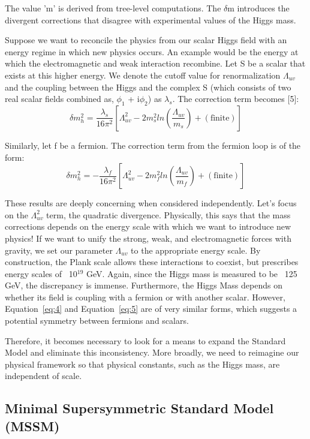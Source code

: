 \documentclass{article}
\begin{document}
The value 'm' is derived from tree-level computations. The $\delta$m introduces the divergent corrections that disagree with experimental values of the Higgs mass.
\par
Suppose we want to reconcile the physics from our scalar Higgs field with an energy regime in which new physics occurs. An example would be the energy at which the electromagnetic and weak interaction recombine. Let S be a scalar that exists at this higher energy. We denote the cutoff value for renormalization $\Lambda_{uv}$ and the coupling between the Higgs and the complex S (which consists of two real scalar fields combined as, $\phi_{1}$ + i$\phi_{2}$) as $\lambda_{s}$. The correction term becomes [5]:
\begin{equation} \label{eq:4}
    {\delta}m_{h}^{2} = \frac{{\lambda}_{s}}{16\pi^{2}}[\Lambda_{uv}^{2}-2m_{s}^{2}ln(\frac{\Lambda_{uv}}{m_{s}}) + (\text{finite})]
\end{equation}
\par
Similarly, let f be a fermion. The correction term from the fermion loop is of the form:
\begin{equation} \label{eq:5}
    {\delta}m_{h}^{2} = -\frac{{\lambda}_{f}}{16\pi^{2}}[\Lambda_{uv}^{2}-2m_{f}^{2}ln(\frac{\Lambda_{uv}}{m_{f}}) + (\text{finite})]
\end{equation}
\par
These results are deeply concerning when considered independently. Let's focus on the $\Lambda_{uv}^{2}$ term, the quadratic divergence. Physically, this says that the mass corrections depends on the energy scale with which we want to introduce new physics! If we want to unify the strong, weak, and electromagnetic forces with gravity, we set our parameter $\Lambda_{uv}$ to the appropriate energy scale. By construction, the Plank scale allows these interactions to coexist, but prescribes energy scales of ~10$^{19}$ GeV. Again, since the Higgs mass is measured to be ~125 GeV, the discrepancy is immense. Furthermore, the Higgs Mass depends on whether its field is coupling with a fermion or with another scalar. However, Equation~\ref{eq:4} and Equation~\ref{eq:5} are of very similar forms, which suggests a potential symmetry between fermions and scalars.
\par
Therefore, it becomes necessary to look for a means to expand the Standard Model and eliminate this inconsistency. More broadly, we need to reimagine our physical framework so that physical constants, such as the Higgs mass, are independent of scale.
\subsection{Minimal Supersymmetric Standard Model (MSSM)}
\end{document}

